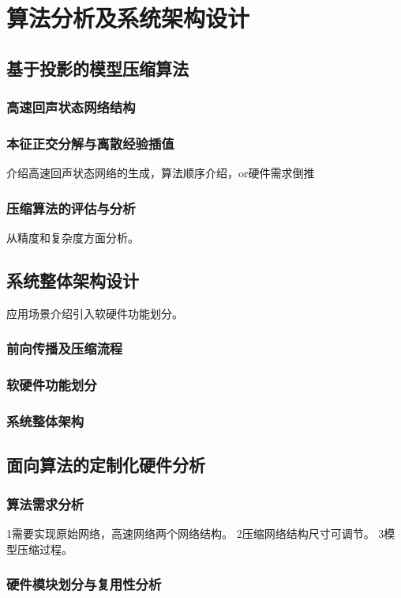 
\chapter{算法分析及系统架构设计}

\section{基于投影的模型压缩算法}
\subsection{高速回声状态网络结构}
\subsection{本征正交分解与离散经验插值}
介绍高速回声状态网络的生成，算法顺序介绍，or硬件需求倒推
\subsection{压缩算法的评估与分析}
从精度和复杂度方面分析。

\section{系统整体架构设计}
应用场景介绍引入软硬件功能划分。
\subsection{前向传播及压缩流程}
\subsection{软硬件功能划分}
\subsection{系统整体架构}

\section{面向算法的定制化硬件分析}
\subsection{算法需求分析}
1需要实现原始网络，高速网络两个网络结构。
2压缩网络结构尺寸可调节。
3模型压缩过程。
\subsection{硬件模块划分与复用性分析}
